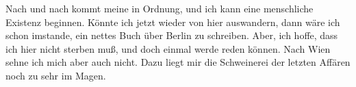 \pstart
           Nach und nach kommt meine \label{K_L03415-5v}\label{K_L03415-5} in Ordnung,
               und ich kann eine menschliche Existenz beginnen. Könnte ich jetzt wieder von hier auswandern, dann wäre ich
               schon imstande, ein nettes Buch über Berlin zu
               schreiben. Aber, ich hoffe, dass ich hier nicht sterben muß, und doch einmal werde
               reden können. Nach Wien sehne ich mich aber auch
               nicht. Dazu liegt mir die Schweinerei der letzten Affären noch zu sehr im Magen.
